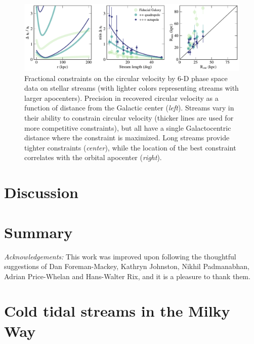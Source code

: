 \documentclass[modern]{aastex61}
\begin{document}
\begin{figure}
\begin{center}
\includegraphics[width=\textwidth]{ar_crb_all.pdf}
\caption{Fractional constraints on the circular velocity by 6-D phase space data on stellar streams (with lighter colors representing streams with larger apocenters).
Precision in recovered circular velocity as a function of distance from the Galactic center (\emph{left}).
Streams vary in their ability to constrain circular velocity (thicker lines are used for more competitive constraints), but all have a single Galactocentric distance where the constraint is maximized.
Long streams provide tighter constraints (\emph{center}), while the location of the best constraint correlates with the orbital apocenter (\emph{right}).
}
\label{fig:vc}
\end{center}
\end{figure}


\section{Discussion}
\label{sec:discussion}


\section{Summary}
\label{sec:summary}


\emph{Acknowledgements:} This work was improved upon following the thoughtful suggestions of Dan Foreman-Mackey, Kathryn Johnston, Nikhil Padmanabhan, Adrian Price-Whelan and Hans-Walter Rix, and it is a pleasure to thank them.




\appendix
\section{Cold tidal streams in the Milky Way}
\label{sec:streams}
\end{document}
